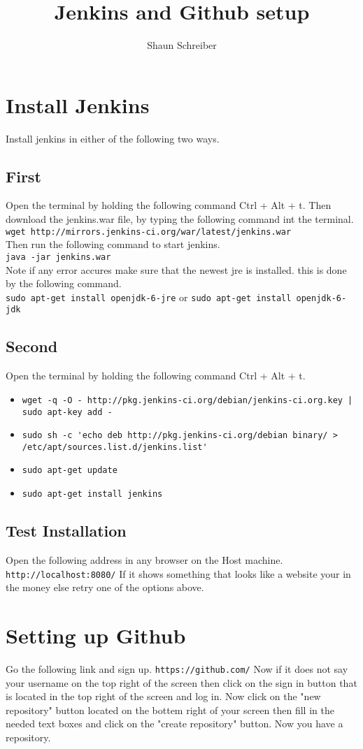 \documentclass[a4paper]{article}
\title{Jenkins and Github setup}
\author{Shaun Schreiber}
\begin{document}
\maketitle
\section{Install Jenkins}
Install jenkins in either of the following two ways.
\subsection{First}
Open the terminal by holding the following command Ctrl + Alt + t.
Then download the jenkins.war file, by typing the following command int the terminal.\\
\verb#wget http://mirrors.jenkins-ci.org/war/latest/jenkins.war#\\
Then run the following command to start jenkins.\\
\verb#java -jar jenkins.war#\\
Note if any error accures make sure that the newest jre is installed.
this is done by the following command.\\
\verb#sudo apt-get install openjdk-6-jre#
or
\verb#sudo apt-get install openjdk-6-jdk#
\subsection{Second}
Open the terminal by holding the following command Ctrl + Alt + t.
\begin{itemize}
\item \verb#wget -q -O - http://pkg.jenkins-ci.org/debian/jenkins-ci.org.key | sudo apt-key add -#
\item \verb#sudo sh -c 'echo deb http://pkg.jenkins-ci.org/debian binary/ > /etc/apt/sources.list.d/jenkins.list'#
\item \verb#sudo apt-get update#
\item \verb#sudo apt-get install jenkins#
\end{itemize}
\subsection{Test Installation}
Open the following address in any browser on the Host machine.
\verb#http://localhost:8080/#
If it shows something that looks like a website your in the money else retry one of the options above.
\section{Setting up Github}
Go the following link and sign up.
\verb#https://github.com/#
Now if it does not say your username on the top right of the screen then click on the sign in 
button that is located in the top right of the screen and log in.
Now click on the "new repository" button located on the bottem right of your screen then fill in the needed text boxes and click on the "create repository" button.
Now you have a repository.
\end{document}
